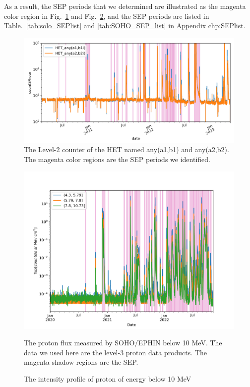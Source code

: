 As a result, the \ac{SEP} periods that we determined are illustrated as the magenta color region in Fig.~\ref{Fig:solo-lvl2} and Fig.~\ref{Fig:SOHO_EPHIN_Proton_flux}, and the \ac{SEP} periods are listed in Table.~\ref{tab:solo_SEPlist} and \ref{tab:SOHO_SEP_list} in Appendix {chp:SEPlist}.



\begin{figure}
    \centering
    \includegraphics[width = \textwidth]{images/ACR/SOLO-lvl2-trriger.png}
    \caption[The L2 counter of \ac{HET}]{The Level-2 counter of the \ac{HET} named any(a1,b1) and any(a2,b2). The magenta color regions are the SEP periods we identified.}
    \label{Fig:solo-lvl2}
\end{figure}



\begin{figure}[!htb]
    \centering
    \includegraphics[width = \textwidth]{images/ACR/SOLO-EPHIN-l3i-log2+6-proton-6H.png}
    \caption{The intensity profile of proton of energy below 10 MeV}{The proton flux measured by SOHO/EPHIN below 10 MeV. The data we used here are the level-3 proton data products. The magenta shadow regions are the SEP.}
    \label{Fig:SOHO_EPHIN_Proton_flux}
\end{figure}

